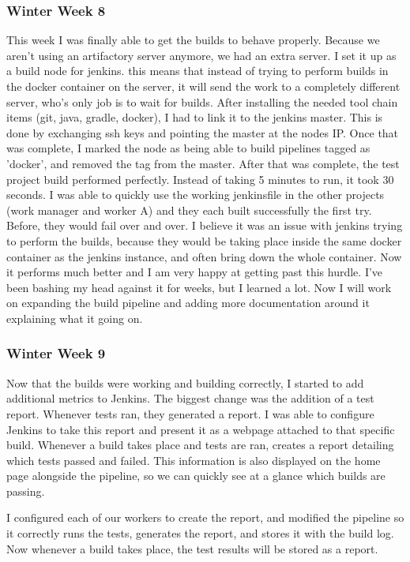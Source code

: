 \documentclass[onecolumn, draftclsnofoot,10pt, compsoc]{IEEEtran}
\begin{document}
\subsubsection*{Winter Week 8}
This week I was finally able to get the builds to behave properly.  
Because we aren't using an artifactory server anymore, we had an extra server.  
I set it up as a build node for jenkins.  this means that instead of trying to perform builds in the docker container on the server, it will send the work to a completely different server, who's only job is to wait for builds.  
After installing the needed tool chain items (git, java, gradle, docker), I had to link it to the jenkins master.  This is done by exchanging ssh keys and pointing the master at the nodes IP.
Once that was complete, I marked the node as being able to build pipelines tagged as 'docker', and removed the tag from the master.  
After that was complete, the test project build performed perfectly.  Instead of taking 5 minutes to run, it took 30 seconds.  
I was able to quickly use the working jenkinsfile in the other projects (work manager and worker A) and they each built successfully the first try. 
Before, they would fail over and over.  
I believe it was an issue with jenkins trying to perform the builds, because they would be taking place inside the same docker container as the jenkins instance, and often bring down the whole container.  
Now it performs much better and I am very happy at getting past this hurdle.  
I've been bashing my head against it for weeks, but I learned a lot.  
Now I will work on expanding the build pipeline and adding more documentation around it explaining what it going on.

\subsubsection*{Winter Week 9}
Now that the builds were working and building correctly, I started to add additional metrics to Jenkins.  
The biggest change was the addition of a test report.  Whenever tests ran, they generated a report. 
I was able to configure Jenkins to take this report and present it as a webpage attached to that specific build.
Whenever a build takes place and tests are ran, creates a report detailing which tests passed and failed.  This information is also displayed on the home page alongside the pipeline, so we can quickly see at a glance which  builds are passing.

I configured each of our workers to create the report, and modified the pipeline so it correctly runs the tests, generates the report, and stores it with the build log.  Now whenever a build takes place, the test results will be stored as a report.
\end{document}
